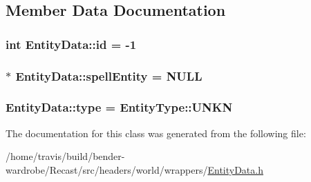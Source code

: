 \subsection{Member Data Documentation}
\hypertarget{class_entity_data_a49d6424bb8ad0b6c6008a54d26ff7b93}{
\subsubsection[{id}]{\setlength{\rightskip}{0pt plus 5cm}int Entity\-Data\-::id = -\/1}}\label{class_entity_data_a49d6424bb8ad0b6c6008a54d26ff7b93}
\hypertarget{class_entity_data_a5c2ab0f4236334b63ebd90800aa07e03}{
\subsubsection[{spell\-Entity}]{$\ast$ Entity\-Data\-::spell\-Entity = N\-U\-L\-L}}\label{class_entity_data_a5c2ab0f4236334b63ebd90800aa07e03}
\hypertarget{class_entity_data_ac1f27faa5c0699cc2e084c92f3cf8c46}{
\subsubsection[{type}]{ Entity\-Data\-::type = {\bf Entity\-Type\-::\-U\-N\-K\-N}}}\label{class_entity_data_ac1f27faa5c0699cc2e084c92f3cf8c46}


The documentation for this class was generated from the following file\-:\begin{DoxyCompactItemize}
\item 
/home/travis/build/bender-\/wardrobe/\-Recast/src/headers/world/wrappers/\hyperlink{_entity_data_8h}{Entity\-Data.\-h}\end{DoxyCompactItemize}
